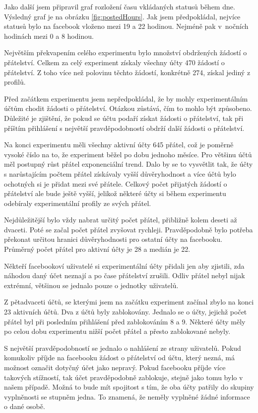 \documentclass[thesis=M,czech]{FITthesis}[2013/05/10]
\begin{document}
Jako další jsem připravil graf rozložení času vkládaných statusů během dne. Výsledný graf je na obrázku \ref{fig:postedHours}. Jak jsem předpokládal, nejvíce statusů bylo na facebook vloženo mezi 19 a 22 hodinou. Nejméně pak v~nočních hodinách mezi 0 a 8 hodinou.



Největším překvapením celého experimentu bylo množství obdržených žádostí o přátelství. Celkem za celý experiment získaly všechny účty 470 žádostí o přátelství. Z toho více než polovinu těchto žádostí, konkrétně 274, získal jediný z profilů. 

Před začátkem experimentu jsem nepředpokládal, že by mohly experimentálním účtům chodit žádosti o přátelství. Otázkou zůstává, čím to mohlo být způsobeno. Důležité je zjištění, že pokud se účtu podaří získat žádosti o přátelství, tak při příštím přihlášení s největší pravděpodobností obdrží další žádosti o přátelství.

Na konci experimentu měli všechny aktivní účty 645 přátel, což je poměrně vysoké číslo na to, že experiment běžel po dobu jednoho měsíce. Pro většinu účtů měl postupný růst přátel exponenciální trend. Dalo by se to vysvětlit tak, že účty s narůstajícím počtem přátel získávaly vyšší důvěryhodnost a více účtů bylo ochotných si je přidat mezi své přátele. Celkový počet přijatých žádostí o přátelství ale bude ještě vyšší, jelikož některé účty si během experimentu odebíraly experimentální profily ze svých přátel. 

Nejdůležitější bylo vždy nabrat určitý počet přátel, přibližně kolem deseti až dvaceti. Poté se začal počet přátel zvyšovat rychleji. Pravděpodobně bylo potřeba překonat určitou hranici důvěryhodnosti pro ostatní účty na facebooku. Průměrný počet přátel pro aktivní účty je 28 a medián je 22. 

Někteří facebookoví uživatelé si experimentální účty přidali jen aby zjistili, zda náhodou daný účet neznají a po čase přátelství zrušili. Odliv přátel nebyl nijak extrémní, většinou se jednalo pouze o jednotky uživatelů. 

Z pětadvaceti účtů, se kterými jsem na začátku experiment začínal zbylo na konci 23 aktivních účtů. Dva z účtů byly zablokovány. Jednalo se o účty, jejichž počet přátel byl při posledním přihlášení před zablokováním 8 a 9. Některé účty měly po celou dobu experimentu nižší počet přátel a přesto zablokované nebyly.

S největší pravděpodobností se jednalo o nahlášení ze strany uživatelů. Pokud komukoliv příjde na facebooku žádost o přátelství od účtu, který nezná, má možnost označit dotyčný účet jako nepravý. Pokud facebooku příjde více takových stížností, tak účet pravděpodobně zablokuje, stejně jako tomu bylo v našem případě. Možná to bude mít spojitost s tím, že oba účty patřily do skupiny vyplněnosti se stupněm jedna. To znamená, že neměly vyplněné žádné informace o dané osobě.
\end{document}
